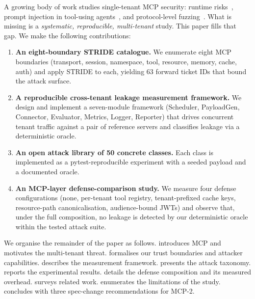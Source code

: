 \documentclass[sigconf, anonymous, natbib=false]{acmart}
\begin{document}
A growing body of work studies single-tenant MCP security:
runtime risks~\cite{chen2026runtime}, prompt injection in
tool-using agents~\cite{greshake2023youve,chowdhury2024},
and protocol-level fuzzing~\cite{zhu2025lspfuzz}. What is
missing is a \emph{systematic, reproducible, multi-tenant}
study. This paper fills that gap. We make the following
contributions:

\begin{enumerate}
  \item \textbf{An eight-boundary STRIDE catalogue.} We
        enumerate eight MCP boundaries (transport, session,
        namespace, tool, resource, memory, cache, auth) and
        apply STRIDE to each, yielding 63 forward ticket
        IDs that bound the attack surface.
  \item \textbf{A reproducible cross-tenant leakage
        measurement framework.} We design and implement a
        seven-module framework (Scheduler, PayloadGen,
        Connector, Evaluator, Metrics, Logger, Reporter)
        that drives concurrent tenant traffic against a
        pair of reference servers and classifies leakage via
        a deterministic oracle.
  \item \textbf{An open attack library of 50 concrete
        classes.} Each class is implemented as a
        pytest-reproducible experiment with a seeded
        payload and a documented oracle.
  \item \textbf{An MCP-layer defense-comparison study.} We
        measure four defense configurations (none,
        per-tenant tool registry, tenant-prefixed cache
        keys, resource-path canonicalisation,
        audience-bound JWTs) and observe that, under the
        full composition, no leakage is detected by our
        deterministic oracle within the tested attack suite.
\end{enumerate}

We organise the remainder of the paper as follows.
 introduces MCP and motivates the
multi-tenant threat.  formalises our trust
boundaries and attacker capabilities. 
describes the measurement framework. 
presents the attack taxonomy.  reports
the experimental results.  details the
defense composition and its measured overhead.
 surveys related work.
 enumerates the limitations of the
study.  concludes with three
spec-change recommendations for MCP-2.
\end{document}
